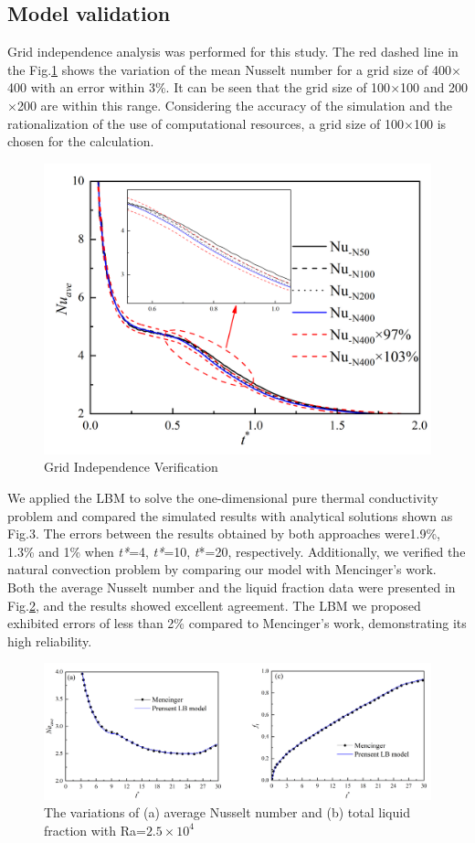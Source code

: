\documentclass[preprint,12pt]{elsarticle}
\begin{document}
\subsection{Model validation}	
Grid independence analysis was performed for this study. The red dashed line in the Fig.\ref{yz} shows the variation of the mean Nusselt number for a grid size of 400$ \times $400 with an error within 3\%. It can be seen that the grid size of 100$ \times $100 and 200$ \times $200 are within this range. Considering the accuracy of the simulation and the rationalization of the use of computational resources, a grid size of 100$ \times $100 is chosen for the calculation.
	\begin{figure}[H]
	\centering
	\includegraphics[scale=0.4]{Fig/网格.png}
	\caption{Grid Independence Verification} 
	\label{yz} 
\end{figure}
We applied the LBM to solve the one-dimensional pure thermal conductivity problem and compared the simulated results with analytical solutions shown as Fig.3. The errors between the results obtained by both approaches were1.9\%, 1.3\% and 1\% when \textit{t*}=4, \textit{t*}=10, \textit{t}*=20, respectively. Additionally, we verified the natural convection problem by comparing our model with Mencinger's work\cite{Mencinger2004NumericalSO}. Both the average Nusselt number and the liquid fraction data were presented in Fig.\ref{Fig_yz}, and the results showed excellent agreement. 
The LBM we proposed exhibited errors of less than 2\% compared to Mencinger's work, demonstrating its high reliability.

	\begin{figure}[H]
	\centering
	\includegraphics[scale=0.6]{Fig/yanz.png}
	\caption{The variations of (a) average Nusselt number and (b) total liquid fraction with Ra=$ 2.5 \times 10^4 $} 
	\label{Fig_yz} 
\end{figure}
\end{document}

